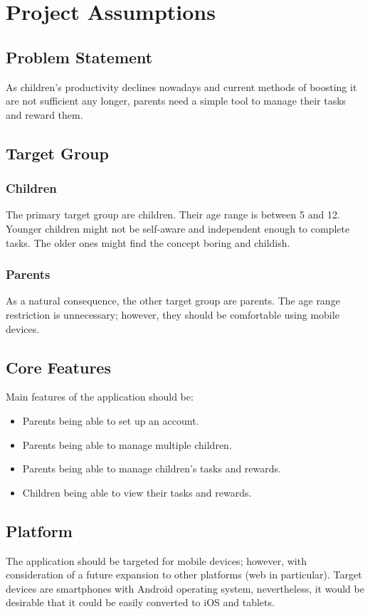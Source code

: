 \chapter{Project Assumptions}\label{ch:assumptions}
\section{Problem Statement}\label{sec:assumptions:problem}
As children's productivity declines nowadays and current methods of boosting it are not sufficient any longer, parents need a simple tool to manage their tasks and reward them.


\section{Target Group}\label{sec:assumptions:target}
\subsection{Children}\label{subsec:assumptions:target:children}
The primary target group are children. Their age range is between 5 and 12. Younger children might not be self-aware and independent enough to complete tasks. The older ones might find the concept boring and childish.

\subsection{Parents}\label{subsec:assumptions:target:parents}
As a natural consequence, the other target group are parents. The age range restriction is unnecessary; however, they should be comfortable using mobile devices.


\section{Core Features}\label{sec:assumptions:features}
Main features of the application should be:
\begin{itemize}
\item Parents being able to set up an account.
\item Parents being able to manage multiple children.
\item Parents being able to manage children's tasks and rewards.
\item Children being able to view their tasks and rewards. 
\end{itemize}


\section{Platform}\label{sec:introduction:platform}
The application should be targeted for mobile devices; however, with consideration of a future expansion to other platforms (web in particular). Target devices are smartphones with Android operating system, nevertheless, it would be desirable that it could be easily converted to iOS and tablets.


